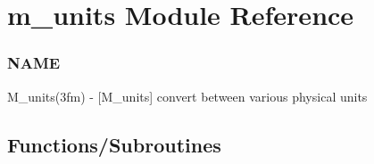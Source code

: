 \hypertarget{namespacem__units}{}\section{m\+\_\+units Module Reference}
\label{namespacem__units}


\subsubsection*{N\+A\+ME}

M\+\_\+units(3fm) -\/ \mbox{[}M\+\_\+units\mbox{]} convert between various physical units  


\subsection*{Functions/\+Subroutines}
